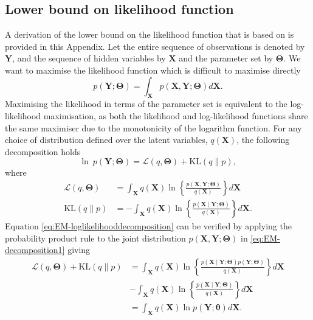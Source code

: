 \documentclass[11pt,draftcls,onecolumn,peerreview]{IEEEtran}
\begin{document}
\subsection{Lower bound on likelihood function}
A derivation of the lower bound on the likelihood function that is based on \cite{Bishop2006} is provided in this Appendix. Let the entire sequence of observations is denoted by $\mathbf Y$, and the sequence of hidden variables by $\mathbf X$ and the parameter set by $\boldsymbol\Theta$. We want to maximise the likelihood function which is difficult to maximise directly
\begin{equation}
 p(\mathbf Y;\boldsymbol\Theta)=\int_{\mathbf X}p(\mathbf X,\mathbf Y;\boldsymbol\Theta)d\mathbf X.
\end{equation}   
Maximising the likelihood in terms of the parameter set is equivalent to the log-likelihood maximisation, as both the likelihood and log-likelihood functions share the same maximiser due to the monotonicity of the logarithm function. For any choice of distribution defined over the latent variables, $q(\mathbf X)$, the following decomposition holds
\begin{equation}\label{eq:EM-loglikelihooddecomposition}
 \ln~p(\mathbf Y;\boldsymbol\Theta)=\mathcal{L}(q,\boldsymbol\Theta)+\mathrm{KL}(q\parallel p),
\end{equation}
where
\begin{align}
 \mathcal{L}(q,\boldsymbol\Theta)&=\int_{\mathbf X} q(\mathbf X)\ln\left\lbrace \frac{p(\mathbf X,\mathbf Y;\boldsymbol\Theta)}{q(\mathbf X)} \right\rbrace d\mathbf X \label{eq:EM-decomposition1}\\
\mathrm{KL}(q\parallel p)&=-\int_{\mathbf X}q(\mathbf X)\ln\left\lbrace \frac{p(\mathbf X \mid \mathbf Y;\boldsymbol\Theta)}{q(\mathbf X)} \right\rbrace d\mathbf X. \label{eq:EM-decomposition2}
\end{align}
Equation \eqref{eq:EM-loglikelihooddecomposition} can be verified by applying the probability product rule to the joint distribution $p(\mathbf X,\mathbf Y;\boldsymbol\Theta)$ in \eqref{eq:EM-decomposition1} giving
\begin{align}
	\mathcal{L}(q,\boldsymbol\Theta)+\mathrm{KL}(q\parallel p)&= \int_{\mathbf X} q(\mathbf X)\ln\left\lbrace \frac{p(\mathbf X \mid \mathbf Y;\boldsymbol\Theta)p(\mathbf Y;\boldsymbol\Theta)}{q(\mathbf X)} \right\rbrace d\mathbf X \nonumber\\
	&- \int_{\mathbf X}q(\mathbf X)\ln\left\lbrace \frac{p(\mathbf X \mid \mathbf Y;\boldsymbol\Theta)}{q(\mathbf X)} \right\rbrace d\mathbf X\nonumber\\
	&= \int_{\mathbf X}q(\mathbf X)\ln p(\mathbf Y; \boldsymbol\theta)d\mathbf X.
\end{align}
\end{document}
